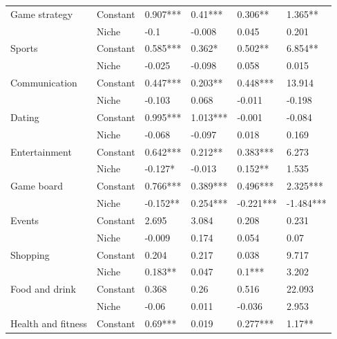 \begin{longtable}[h!]{llllll}
\cline{1-6}
\multirow{2}{*}{Game strategy} & Constant &            0.907*** &     0.41*** &    0.306** &    1.365** \\
          & Niche &                -0.1 &      -0.008 &      0.045 &      0.201 \\
\cline{1-6}
\multirow{2}{*}{Sports} & Constant &            0.585*** &      0.362* &    0.502** &    6.854** \\
          & Niche &              -0.025 &      -0.098 &      0.058 &      0.015 \\
\cline{1-6}
\multirow{2}{*}{Communication} & Constant &            0.447*** &     0.203** &   0.448*** &     13.914 \\
          & Niche &              -0.103 &       0.068 &     -0.011 &     -0.198 \\
\cline{1-6}
\multirow{2}{*}{Dating} & Constant &            0.995*** &    1.013*** &     -0.001 &     -0.084 \\
          & Niche &              -0.068 &      -0.097 &      0.018 &      0.169 \\
\cline{1-6}
\multirow{2}{*}{Entertainment} & Constant &            0.642*** &     0.212** &   0.383*** &      6.273 \\
          & Niche &             -0.127* &      -0.013 &    0.152** &      1.535 \\
\cline{1-6}
\multirow{2}{*}{Game board} & Constant &            0.766*** &    0.389*** &   0.496*** &   2.325*** \\
          & Niche &            -0.152** &    0.254*** &  -0.221*** &  -1.484*** \\
\cline{1-6}
\multirow{2}{*}{Events} & Constant &               2.695 &       3.084 &      0.208 &      0.231 \\
          & Niche &              -0.009 &       0.174 &      0.054 &       0.07 \\
\cline{1-6}
\multirow{2}{*}{Shopping} & Constant &               0.204 &       0.217 &      0.038 &      9.717 \\
          & Niche &             0.183** &       0.047 &     0.1*** &      3.202 \\
\cline{1-6}
\multirow{2}{*}{Food and drink} & Constant &               0.368 &        0.26 &      0.516 &     22.093 \\
          & Niche &               -0.06 &       0.011 &     -0.036 &      2.953 \\
\cline{1-6}
\multirow{2}{*}{Health and fitness} & Constant &             0.69*** &       0.019 &   0.277*** &     1.17** \\

\end{longtable}
